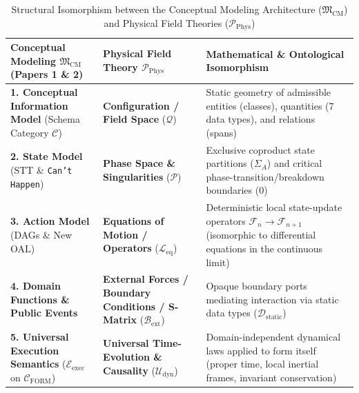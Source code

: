\documentclass[11pt,a4paper]{article}
\theoremstyle{definition}
\theoremstyle{plain}
\theoremstyle{remark}
\newcommand{\Cform}{\mathcal{C}_{\mathrm{FORM}}}
\newcommand{\Dstatic}{\mathcal{D}_{\mathrm{static}}}
\begin{document}
\begin{table}[htbp]
\centering
\caption{Structural Isomorphism between the Conceptual Modeling Architecture ($\mathfrak{M}_{\mathrm{CM}}$) and Physical Field Theories ($\mathcal{P}_{\mathrm{Phys}}$)}
\label{tab:phys-iso}
\small
\begin{tabular}{>{\raggedright\arraybackslash}p{4.3cm} >{\raggedright\arraybackslash}p{4.1cm} >{\raggedright\arraybackslash}p{6.0cm}}
\toprule
\textbf{Conceptual Modeling $\mathfrak{M}_{\mathrm{CM}}$ (Papers 1 \& 2)} & \textbf{Physical Field Theory $\mathcal{P}_{\mathrm{Phys}}$} & \textbf{Mathematical \& Ontological Isomorphism} \\
\midrule
\textbf{1. Conceptual Information Model} (Schema Category $\mathcal{C}$) & \textbf{Configuration / Field Space} ($\mathcal{Q}$) & Static geometry of admissible entities (classes), quantities (7 data types), and relations (spans) \\
\addlinespace
\textbf{2. State Model} (STT \& \texttt{Can't Happen}) & \textbf{Phase Space \& Singularities} ($\mathcal{P}$) & Exclusive coproduct state partitions ($\Sigma_A$) and critical phase-transition/breakdown boundaries ($0$) \\
\addlinespace
\textbf{3. Action Model} (DAGs \& New OAL) & \textbf{Equations of Motion / Operators} ($\mathcal{L}_{\mathrm{eq}}$) & Deterministic local state-update operators $\mathcal{F}_n \to \mathcal{F}_{n+1}$ (isomorphic to differential equations in the continuous limit) \\
\addlinespace
\textbf{4. Domain Functions \& Public Events} & \textbf{External Forces / Boundary Conditions / S-Matrix} ($\mathcal{B}_{\mathrm{ext}}$) & Opaque boundary ports mediating interaction via static data types ($\Dstatic$) \\
\addlinespace
\textbf{5. Universal Execution Semantics} ($\mathcal{E}_{\mathrm{exec}}$ on $\Cform$) & \textbf{Universal Time-Evolution \& Causality} ($\mathcal{U}_{\mathrm{dyn}}$) & Domain-independent dynamical laws applied to form itself (proper time, local inertial frames, invariant conservation) \\
\bottomrule
\end{tabular}
\end{table}
\end{document}
